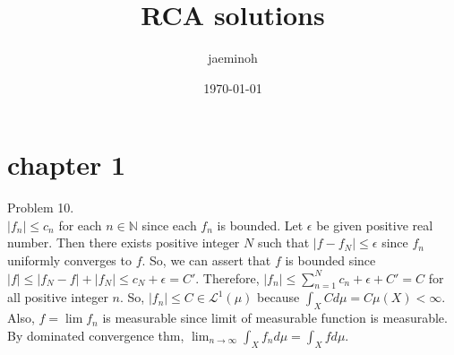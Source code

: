 \documentclass{amsart}
\author{jaeminoh}
\date{\today}
\title{RCA solutions}
\begin{document}
\maketitle

\section*{chapter 1}
Problem 10. \\

$\left | f_n \right | \leq c_n$ for each $n \in \mathbb{N}$ since each $f_n$ is bounded.
Let $\epsilon$ be given positive real number.
Then there exists positive integer $N$ such that $\left | f - f_N \right | \leq \epsilon$ since $f_n$ uniformly converges to $f$.
So, we can assert that $f$ is bounded since $\left | f \right | \leq \left | f_N - f \right | + \left | f_N \right | \leq c_N + \epsilon = C'$.
Therefore, $\left | f_n \right | \leq \sum_{n=1}^N c_n + \epsilon + C' = C$ for all positive integer $n$.
So, $\left | f_n \right | \leq C \in \mathcal{L}^1(\mu)$ because $\int _X C d\mu = C\mu(X) < \infty$.
Also, $f = \lim f_n$ is measurable since limit of measurable function is measurable.
By dominated convergence thm, $\lim_{n \rightarrow \infty} \int_X f_n d\mu = \int_X f d\mu$.
\end{document}
